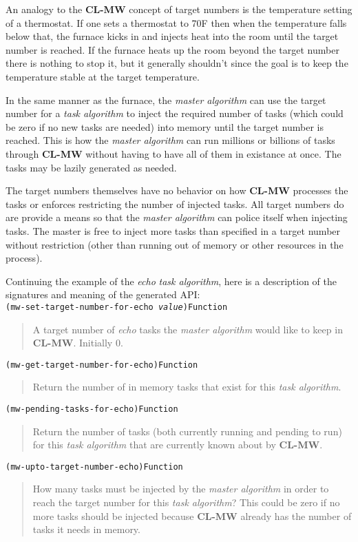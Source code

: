 \documentclass[titlepage,12pt]{book}
\newcommand{\xsmall}{\latexhtml{\small}{}}
\newcommand{\xnormalsize}{\latexhtml{\normalsize}{}}
\newcommand{\clmw}{\xsmall\textbf{CL-MW}\xnormalsize\xspace}
\newcommand{\ma}{\textit{master algorithm}\xspace}
\newcommand{\ta}{\textit{task algorithm}\xspace}
\newcommand{\apifunc}[2]{\noindent\xsmall\texttt{(#1)}\hspace*{\fill}\xnormalsize\texttt{#2}}
\newenvironment{apientry}[2]
	{\apifunc{#1}{#2}\begin{quotation}}
	{\end{quotation}}
\begin{document}
An analogy to the \clmw concept of target numbers is the temperature
setting of a thermostat. If one sets a thermostat to 70{\textdegree}F
then when the temperature falls below that, the furnace kicks in and
injects heat into the room until the target number is reached. If the
furnace heats up the room beyond the target number there is nothing
to stop it, but it generally shouldn't since the goal is to keep the
temperature stable at the target temperature.

In the same manner as the furnace, the \ma can use the target number
for a \ta to inject the required number of tasks (which could be zero
if no new tasks are needed) into memory until the target number is
reached. This is how the \ma can run millions or billions of tasks
through \clmw without having to have all of them in existance at
once. The tasks may be lazily generated as needed.

The target numbers themselves have no behavior on how \clmw processes
the tasks or enforces restricting the number of injected tasks.
All target numbers do are provide a means so that the \ma can police
itself when injecting tasks. The master is free to inject more tasks
than specified in a target number without restriction (other than
running out of memory or other resources in the process).

Continuing the example of the \emph{echo} \ta, here is a description of the
signatures and meaning of the generated API:\\

\begin{apientry}
{mw-set-target-number-for-echo \emph{value}}
{Function}
	A target number of \textit{echo} tasks the \ma would like to keep in
\clmw. Initially 0.
\end{apientry}

\begin{apientry}
{mw-get-target-number-for-echo}
{Function}
	Return the number of in memory tasks that exist for this \ta.
\end{apientry}

\begin{apientry}
{mw-pending-tasks-for-echo}
{Function}
	Return the number of tasks (both currently running and pending
	to run) for this \ta that are currently known about by \clmw.
\end{apientry}

\begin{apientry}
{mw-upto-target-number-echo}
{Function}
	How many tasks must be injected by the \ma in order to reach the
	target number for this \ta? This could be zero if no more tasks should
	be injected because \clmw already has the number of tasks it needs in
	memory.
\end{apientry}
\end{document}
